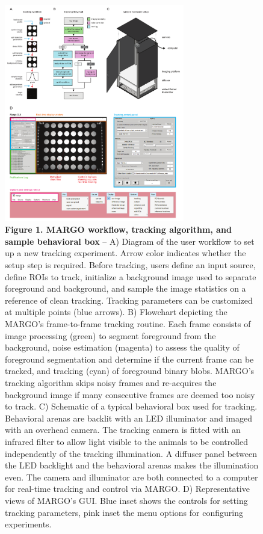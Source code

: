 \documentclass[10pt]{article}
\begin{document}
\clearpage
\begin{figure}[t!]
	\begin{center}
		\includegraphics[width=0.7\textwidth]{../figures/autotracker_overview.pdf}
	\end{center}
	\caption*{\footnotesize \textbf{Figure 1. MARGO workflow, tracking algorithm, and sample behavioral box} -- A) Diagram of the user workflow to set up a new tracking experiment. Arrow color indicates whether the setup step is required. Before tracking, users define an input source, define ROIs to track, initialize a background image used to separate foreground and background, and sample the image statistics on a reference of clean tracking. Tracking parameters can be customized at multiple points (blue arrows). B) Flowchart depicting the MARGO's frame-to-frame tracking routine. Each frame consists of image processing (green) to segment foreground from the background, noise estimation (magenta) to assess the quality of foreground segmentation and determine if the current frame can be tracked, and tracking (cyan) of foreground binary blobs. MARGO's tracking algorithm skips noisy frames and re-acquires the background image if many consecutive frames are deemed too noisy to track. C) Schematic of a typical behavioral box used for tracking. Behavioral arenas are backlit with an LED illuminator and imaged with an overhead camera. The tracking camera is fitted with an infrared filter to allow light visible to the animals to be controlled independently of the tracking illumination. A diffuser panel between the LED backlight and the behavioral arenas makes the illumination even. The camera and illuminator are both connected to a computer for real-time tracking and control via MARGO. D) Representative views of MARGO's GUI. Blue inset shows the controls for setting tracking parameters, pink inset the menu options for configuring experiments.}
\end{figure}
\end{document}
